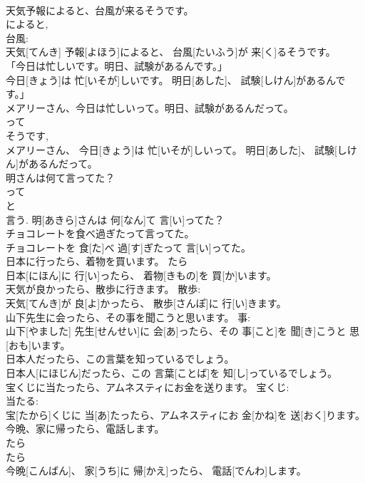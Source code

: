 \documentclass[8pt]{extreport}
\begin{document}
\begin{CJK}{UTF8}{min}
\\	天気予報によると、台風が来るそうです。	
\\	によると, 
\\	台風: 
\\	天気[てんき] 予報[よほう]によると、 台風[たいふう]が 来[く]るそうです。	
\\	「今日は忙しいです。明日、試験があるんです。」	
\\	今日[きょう]は 忙[いそが]しいです。 明日[あした]、 試験[しけん]があるんです。」	
\\	メアリーさん、今日は忙しいって。明日、試験があるんだって。	
\\	って 
\\	そうです, 
\\	メアリーさん、 今日[きょう]は 忙[いそが]しいって。 明日[あした]、 試験[しけん]があるんだって。	
\\	明さんは何て言ってた？	
\\	って 
\\	と 
\\	言う.	明[あきら]さんは 何[なん]て 言[い]ってた？	
\\	チョコレートを食べ過ぎたって言ってた。	
\\	チョコレートを 食[た]べ 過[す]ぎたって 言[い]ってた。	
\\	日本に行ったら、着物を買います。	たら 
\\	日本[にほん]に 行[い]ったら、 着物[きもの]を 買[か]います。	
\\	天気が良かったら、散歩に行きます。	散歩: 
\\	天気[てんき]が 良[よ]かったら、 散歩[さんぽ]に 行[い]きます。	
\\	山下先生に会ったら、その事を聞こうと思います。	事: 
\\	山下[やました] 先生[せんせい]に 会[あ]ったら、その 事[こと]を 聞[き]こうと 思[おも]います。	
\\	日本人だったら、この言葉を知っているでしょう。	
\\	日本人[にほじん]だったら、この 言葉[ことば]を 知[し]っているでしょう。	
\\	宝くじに当たったら、アムネスティにお金を送ります。	宝くじ: 
\\	当たる: 
\\	宝[たから]くじに 当[あ]たったら、アムネスティにお 金[かね]を 送[おく]ります。	
\\	今晩、家に帰ったら、電話します。	
\\	たら 
\\	たら 
\\	今晩[こんばん]、 家[うち]に 帰[かえ]ったら、 電話[でんわ]します。	

\end{CJK}
\end{document}
